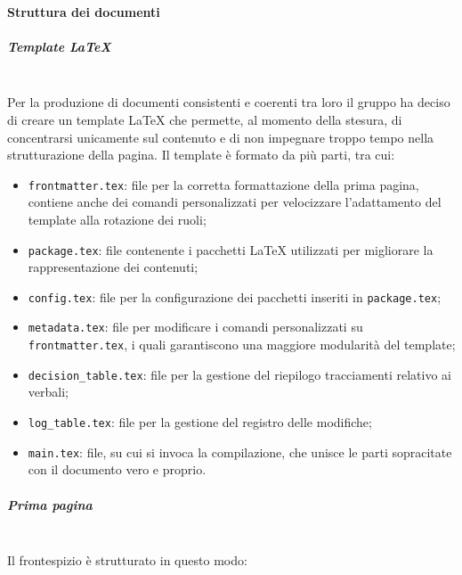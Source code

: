         \paragraph{Struttura dei documenti}
        \setlength{\parindent}{0cm}
            \subparagraph{Template \LaTeX}\mbox{}\\ [1mm]
                Per la produzione di documenti consistenti e coerenti tra loro il gruppo ha deciso di creare un template \LaTeX \xspace che permette, al momento della stesura, di concentrarsi unicamente sul contenuto e di non impegnare troppo tempo nella strutturazione della pagina. Il template è formato da
                più parti, tra cui:
                \begin{itemize}
                    \item \verb|frontmatter.tex|: file per la corretta formattazione della prima pagina, contiene anche dei comandi personalizzati per velocizzare l'adattamento del template alla rotazione dei ruoli;
                    \item \verb|package.tex|: file contenente i pacchetti \LaTeX \xspace utilizzati per migliorare la rappresentazione dei contenuti;
                    \item \verb|config.tex|: file per la configurazione dei pacchetti inseriti in \verb|package.tex|;
                    \item \verb|metadata.tex|: file per modificare i comandi personalizzati su \verb|frontmatter.tex|, i quali garantiscono una maggiore modularità del template;
                    \item \verb|decision_table.tex|: file per la gestione del riepilogo tracciamenti relativo ai verbali;
                    \item \verb|log_table.tex|: file per la gestione del registro delle modifiche;
                    \item \verb|main.tex|: file, su cui si invoca la compilazione, che unisce le parti sopracitate con il documento vero e proprio.
                \end{itemize}
            \subparagraph{Prima pagina}\mbox{}\\ [1mm]
                Il frontespizio è strutturato in questo modo:
